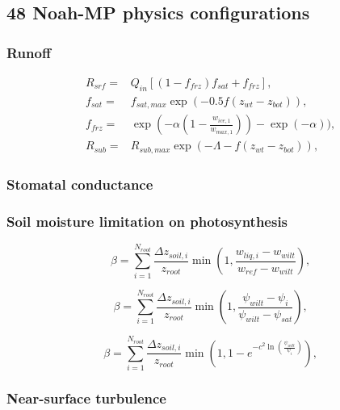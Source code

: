 \documentclass[essd]{copernicus}
\begin{document}
\subsection{48 Noah-MP physics configurations} \label{sec:data:noahmp}

\subsubsection{Runoff}

\begin{align}
    R_{srf} = & Q_{in} [(1 - f_{frz}) f_{sat} + f_{frz} ] \text{,}                                  \\
    f_{sat} = & f_{sat,max} \exp(-0.5 f (z_{wt} - z_{bot})) \text{,}                                \\
    f_{frz} = & \exp\left(-\alpha(1 - \frac{w_{ice,1}}{w_{max,1}})\right) - \exp(-\alpha)) \text{,} \\
    R_{sub} = & R_{sub,max} \exp\left( -\Lambda - f(z_{wt} - z_{bot}) \right) \text{,}
\end{align}

\subsubsection{Stomatal conductance}

\subsubsection{Soil moisture limitation on photosynthesis}

\begin{equation}
    \beta = \sum_{i=1}^{N_{root}} \frac{\Delta z_{soil,i}}{z_{root}} \min\left(1, \frac{w_{liq,i} - w_{wilt}}{w_{ref} - w_{wilt}}\right) \text{,}
\end{equation}

\begin{equation}
    \beta = \sum_{i=1}^{N_{root}} \frac{\Delta z_{soil,i}}{z_{root}} \min\left(1, \frac{\psi_{wilt} - \psi_{i}}{\psi_{wilt} - \psi_{sat}}\right) \text{,}
\end{equation}

\begin{equation}
    \beta = \sum_{i=1}^{N_{root}} \frac{\Delta z_{soil,i}}{z_{root}} \min\left(1, 1 - e^{-c^2 \ln\left(\frac{\psi_{wilt}}{\psi_{i}} \right)} \right) \text{,}
\end{equation}

\subsubsection{Near-surface turbulence}
\end{document}
